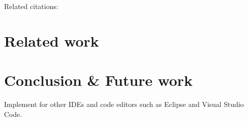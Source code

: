 \documentclass[sigconf]{acmart}
\begin{document}
Related citations:
\cite{jeanjeanIDECodeReifying2021,raskVisualStudioCode2020,borkLanguageServerProtocol2023}

\section{Related work} \label{sec:relatedWork}

\section{Conclusion \& Future work} \label{sec:conclusion}




Implement for other IDEs and code editors such as Eclipse \cite{desrivieresEclipsePlatformIntegrating2004} and Visual Studio Code.





\end{document}
